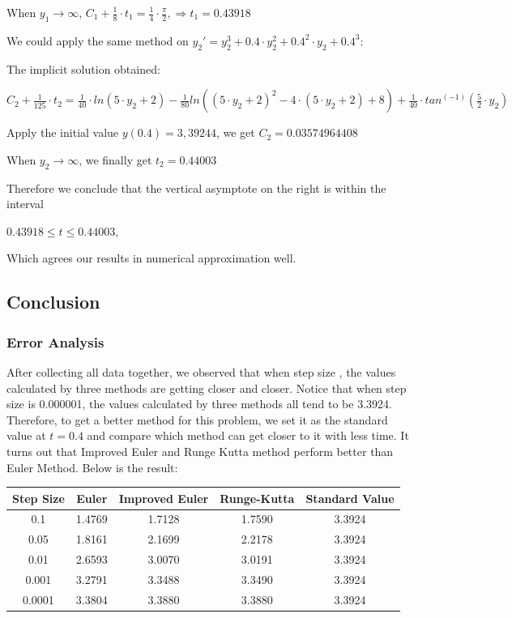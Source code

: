 \documentclass[11pt,a4paper]{article}
\begin{document}
When $y_1 \rightarrow \infty$, $C_1+ \frac{1}{8}\cdot t_1 = \frac{1}{4} \cdot \frac{\pi}{2}, \Rightarrow t_1 = 0.43918$

We could apply the same method on $y_2' = y_2^3 + 0.4 \cdot y_2^2 + 0.4^2 \cdot y_2 + 0.4 ^3$:

The implicit solution obtained:

\begin{center}
	$C_2 + \frac{1}{125}\cdot t_2 = \frac{1}{40}\cdot ln(5\cdot y_2 + 2)- \frac{1}{80}ln((5\cdot y_2+2)^2 - 4\cdot(5\cdot y_2 + 2)+8)+ \frac{1}{40}\cdot tan^(-1)(\frac{5}{2}\cdot y_2)$
\end{center}

Apply the initial value $y(0.4)=3,39244$, we get $C_2=0.03574964408$

When $y_2 \rightarrow \infty$, we finally get $t_2=0.44003$

Therefore we conclude that the vertical asymptote on the right is within the interval 

\begin{center}
	$0.43918 \leq t \leq 0.44003$, 
\end{center}

Which agrees our results in numerical approximation well.

\subsection{Conclusion}

\subsubsection{Error Analysis}

After collecting all data together, we observed that when step size , the values calculated by three methods are getting closer and closer. Notice that when step size is 0.000001, the values calculated by three methods all tend to be 3.3924. Therefore, to get a better method for this problem, we set it as the standard value at $t = 0.4$ and compare which method can get closer to it with less time. It turns out that Improved Euler and Runge Kutta method perform better than Euler Method. Below is the result:

\begin{table}[H]
	\centering
	\begin{tabular}{c|c|c|c|c}
		Step Size & Euler  & Improved Euler & Runge-Kutta & Standard Value \\ \hline
		0.1       & 1.4769 & 1.7128         & 1.7590      & 3.3924         \\ \hline
		0.05      & 1.8161 & 2.1699         & 2.2178      & 3.3924         \\ \hline
		0.01      & 2.6593 & 3.0070         & 3.0191      & 3.3924         \\ \hline
		0.001     & 3.2791 & 3.3488         & 3.3490      & 3.3924         \\ \hline
		0.0001    & 3.3804 & 3.3880         & 3.3880      & 3.3924        
	\end{tabular}
\end{table}
\end{document}
